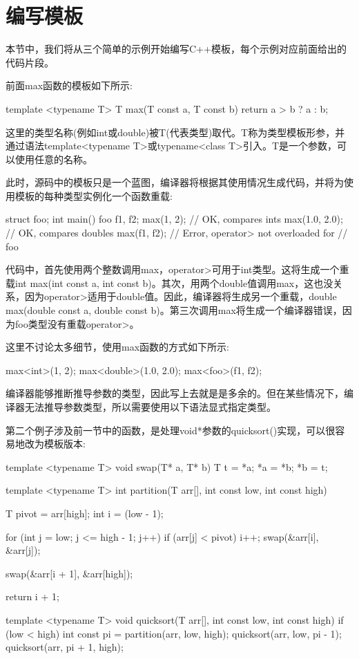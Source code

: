 \section{编写模板}
本节中，我们将从三个简单的示例开始编写C++模板，每个示例对应前面给出的代码片段。

前面max函数的模板如下所示:

\begin{cpp}
template <typename T>
T max(T const a, T const b)
{
	return a > b ? a : b;
}
\end{cpp}

这里的类型名称(例如int或double)被T(代表类型)取代。T称为类型模板形参，并通过语法template<typename T>或typename<class T>引入。T是一个参数，可以使用任意的名称。

此时，源码中的模板只是一个蓝图，编译器将根据其使用情况生成代码，并将为使用模板的每种类型实例化一个函数重载:

\begin{cpp}
struct foo{};
int main()
{
	foo f1, f2;
	max(1, 2); // OK, compares ints
	max(1.0, 2.0); // OK, compares doubles
	max(f1, f2); // Error, operator> not overloaded for
	             // foo
}
\end{cpp}

代码中，首先使用两个整数调用max，operator>可用于int类型。这将生成一个重载int max(int const a, int const b)。其次，用两个double值调用max，这也没关系，因为operator>适用于double值。因此，编译器将生成另一个重载，double max(double const a, double const b)。第三次调用max将生成一个编译器错误，因为foo类型没有重载operator>。

这里不讨论太多细节，使用max函数的方式如下所示:

\begin{cpp}
max<int>(1, 2);
max<double>(1.0, 2.0);
max<foo>(f1, f2);
\end{cpp}

编译器能够推断推导参数的类型，因此写上去就是是多余的。但在某些情况下，编译器无法推导参数类型，所以需要使用以下语法显式指定类型。

第二个例子涉及前一节中的函数，是处理void*参数的quicksort()实现，可以很容易地改为模板版本:

\begin{cpp}
template <typename T>
void swap(T* a, T* b)
{
	T t = *a;
	*a = *b;
	*b = t;
}

template <typename T>
int partition(T arr[], int const low, int const high)
{
	T pivot = arr[high];
	int i = (low - 1);
	
	for (int j = low; j <= high - 1; j++)
	{
		if (arr[j] < pivot)
		{
			i++;
			swap(&arr[i], &arr[j]);
		}
	}

	swap(&arr[i + 1], &arr[high]);
	
	return i + 1;
}

template <typename T>
void quicksort(T arr[], int const low, int const high)
{
	if (low < high)
	{
		int const pi = partition(arr, low, high);
		quicksort(arr, low, pi - 1);
		quicksort(arr, pi + 1, high);
	}
}
\end{cpp}

